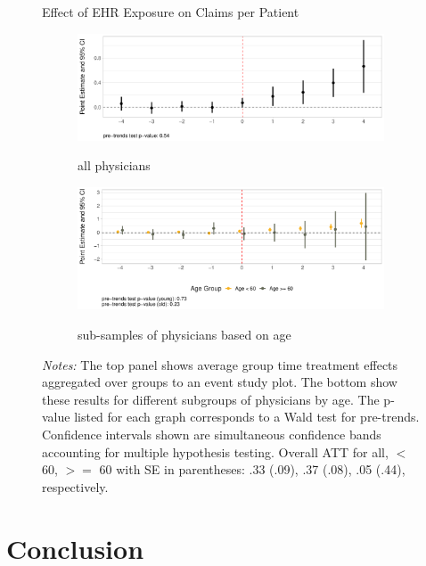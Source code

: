 \documentclass[12pt]{article}
\begin{document}
\begin{figure}[ht!]
\centering
    \captionsetup{width=.7\linewidth}
    \caption{Effect of EHR Exposure on Claims per Patient}
   \begin{subfigure}[]{.8\textwidth}
   \caption{all physicians}
   \includegraphics[scale=.45]{Objects/claim_per_patient_plot_all.pdf}
   \label{fig:claima} 
\end{subfigure}

\vspace{3mm}

\begin{subfigure}[]{.8\textwidth}
\caption{sub-samples of physicians based on age}
   \includegraphics[scale=.45]{Objects/claim_per_patient_plot_ages.pdf}
   \label{fig:claimb}
\end{subfigure}
\vspace{2mm}
    \caption*{\footnotesize{\textit{Notes:} The top panel shows average group time treatment effects aggregated over groups to an event study plot. The bottom show these results for different subgroups of physicians by age. The p-value listed for each graph corresponds to a Wald test for pre-trends. Confidence intervals shown are simultaneous confidence bands accounting for multiple hypothesis testing. Overall ATT for all, $<$ 60, $>=$ 60 with SE in parentheses: .33 (.09), .37 (.08), .05 (.44), respectively.}}
\end{figure}


\section{Conclusion}
\end{document}
